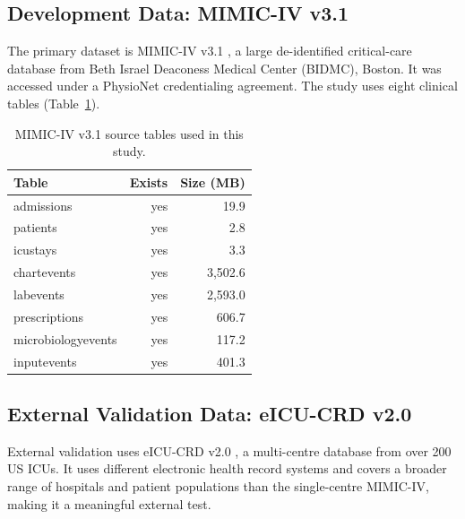 \subsection{Development Data: MIMIC-IV v3.1}

The primary dataset is MIMIC-IV v3.1 \cite{johnson2023mimiciv,johnson2023mimiciv_scidata,pollard2026physionet}, a large
de-identified critical-care database from Beth Israel Deaconess Medical Center
(BIDMC), Boston. It was accessed under a PhysioNet credentialing agreement. The
study uses eight clinical tables (Table~\ref{tab:data_sources}).

\begin{table}[H]
    \centering
    \begin{tabular}{lrr}
        \toprule
        \textbf{Table}     & \textbf{Exists} & \textbf{Size (MB)} \\
        \midrule
        admissions         & yes             & 19.9               \\
        patients           & yes             & 2.8                \\
        icustays           & yes             & 3.3                \\
        chartevents        & yes             & 3,502.6            \\
        labevents          & yes             & 2,593.0            \\
        prescriptions      & yes             & 606.7              \\
        microbiologyevents & yes             & 117.2              \\
        inputevents        & yes             & 401.3              \\
        \bottomrule
    \end{tabular}
    \caption{MIMIC-IV v3.1 source tables used in this study.}
    \label{tab:data_sources}
\end{table}

\subsection{External Validation Data: eICU-CRD v2.0}

External validation uses eICU-CRD v2.0 \cite{pollard2018eicu}, a
multi-centre database from over 200 US ICUs. It uses different electronic health
record systems and covers a broader range of hospitals and patient populations
than the single-centre MIMIC-IV, making it a meaningful external test.

